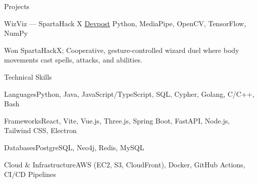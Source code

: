 \documentclass[
	11pt
]{../../resume}
\begin{document}
\begin{rSection}{P}{rojects}
		\begin{rSectionEntry}
			{WizViz --- SpartaHack X}
			{\href{https://devpost.com/software/wizviz}{Devpost}}
			{}
			{Python, MediaPipe, OpenCV, TensorFlow, NumPy}
			{}

			\item Won SpartaHackX; Cooperative, gesture-controlled wizard duel where body movements cast spells, attacks, and abilities.
		\end{rSectionEntry}
	\end{rSection}

	\begin{rSection}{T}{echnical Skills}
		\begin{rSet}{Languages}{Python, Java, JavaScript/TypeScript, SQL, Cypher, Golang, C/C++, Bash}
		\end{rSet}
		\begin{rSet}{Frameworks}{React, Vite, Vue.js, Three.js, Spring Boot, FastAPI, Node.js, Tailwind CSS, Electron}
		\end{rSet}
		\begin{rSet}{Databases}{PostgreSQL, Neo4j, Redis, MySQL}
		\end{rSet}
		\begin{rSet}{Cloud \& Infrastructure}{AWS (EC2, S3, CloudFront), Docker, GitHub Actions, CI/CD Pipelines}
		\end{rSet}
	\end{rSection}
\end{document}
